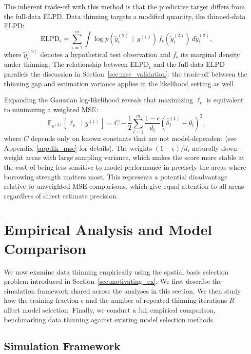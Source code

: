 \documentclass[11pt]{article}
\newcommand{\given}{\,\mid\,}
\newcommand{\thetatrain}{\hat{\theta}^{(1)}}           %
\newcommand{\ytrain}{y^{(1)}}                           %
\newcommand{\ytest}{y^{(2)}}                            %
\newcommand{\E}[2][]{\mathbb{E}_{#1}\!\left[\,#2\,\right]}
\theoremstyle{plain}
\theoremstyle{definition}
\theoremstyle{remark}
\begin{document}
The inherent trade-off with this method is that the predictive target differs from the full-data ELPD. Data thinning targets a modified quantity, the thinned-data ELPD:
\[
\mathrm{ELPD}_\epsilon = \sum_{i=1}^m \int \log p(\tilde{y}^{(2)}_i \given \ytrain)\, f_\epsilon(\tilde{y}^{(2)}_i)\, d\tilde{y}^{(2)}_i,
\]
where $\tilde{y}^{(2)}_i$ denotes a hypothetical test observation and $f_\epsilon$ its marginal density under thinning. The relationship between $\mathrm{ELPD}_\epsilon$ and the full-data $\mathrm{ELPD}$ parallels the discussion in Section~\ref{sec:mse_validation}: the trade-off between the thinning gap and estimation variance applies in the likelihood setting as well.

Expanding the Gaussian log-likelihood reveals that maximizing $\ell_{\epsilon}$ is equivalent to minimizing a weighted MSE:
\[
\E[\ytest]{\ell_{\epsilon} \given \ytrain} = C - \frac{1}{2}\sum_{i=1}^m \frac{1-\epsilon}{d_i} \left( \thetatrain_i - \theta_i \right)^2,
\]
where $C$ depends only on known constants that are not model-dependent (see Appendix~\ref{app:lik_mse} for details). The weights $(1-\epsilon)/d_i$ naturally down-weight areas with large sampling variance, which makes the score more stable at the cost of being less sensitive to model performance in precisely the areas where borrowing strength matters most. This represents a potential disadvantage relative to unweighted MSE comparisons, which give equal attention to all areas regardless of direct estimate precision.



\section{Empirical Analysis and Model Comparison}\label{sec:empirical}

We now examine data thinning empirically using the spatial basis selection problem introduced in Section~\ref{sec:motivating_ex}. We first describe the simulation framework shared across the analyses in this section. We then study how the training fraction $\epsilon$ and the number of repeated thinning iterations $R$ affect model selection. Finally, we conduct a full empirical comparison, benchmarking data thinning against existing model selection methods.


\subsection{Simulation Framework}\label{sec:sim_framework}
\end{document}
